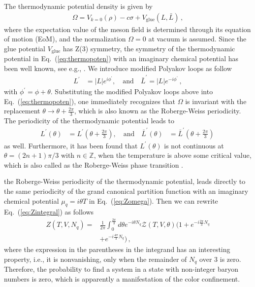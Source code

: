 \documentclass[%
reprint,
superscriptaddress,
showpacs,preprintnumbers,
 amsmath,amssymb,
 aps,
prd,
]{revtex4-1}
\def\Eq#1{Eq.~(\ref{#1})}
\begin{document}
The thermodynamic potential density is given by 
\begin{align}
  \Omega=V_{k=0}(\rho)-c\sigma+V_\text{glue}(L,\bar L)\,,\label{eq:thermopoten}
\end{align}
where the expectation value of the meson field is determined through its equation of motion (EoM), and the normalization $\Omega=0$ at vacuum is assumed. Since the glue potential $V_\text{glue}$ has Z(3) symmetry, the symmetry of the thermodynamic potential in \Eq{eq:thermopoten} with an imaginary chemical potential has been well known, see e.g., \cite{Roberge:1986mm,Sakai:2008py}. We introduce modified Polyakov loops as follow
\begin{align}
  L^{\prime}&=|L| e^{i\phi^{\prime}},\quad \text{and}\quad \bar L^{\prime}=|L| e^{-i\phi^{\prime}}\,,\label{eq:Ploopmodi}
\end{align}
with $\phi^{\prime}=\phi+\theta$. Substituting the modified Polyakov loops above into \Eq{eq:thermopoten}, one immediately recognizes that $ \Omega$ is invariant with the replacement $\theta \rightarrow \theta + \frac{2\pi}{3}$, which is also known as the Roberge-Weiss periodicity. The periodicity of the thermodynamic potential leads to
\begin{align}
  L^{\prime}(\theta)&=L^{\prime}(\theta+\frac{2\pi}{3}),\quad \text{and}\quad \bar L^{\prime}(\theta)&=\bar L^{\prime}(\theta+\frac{2\pi}{3})\,\label{}
\end{align}
as well. Furthermore, it has been found that $L^{\prime}(\theta)$ is not continuous at $\theta=(2n+1)\pi/3$ with $n\in\mathbb{Z}$, when the temperature is above some critical value, which is also called as the Roberge-Weiss phase transition \cite{Roberge:1986mm}.

the Roberge-Weiss periodicity of the thermodynamic potential, leads directly to the same periodicity of the grand canonical partition function with an imaginary chemical potential $\mu_q=i \theta T$ in \Eq{eq:Zomega}. Then we can rewrite \Eq{eq:Zintegral} as follows
\begin{align}
  Z(T,V,N_q)=&\frac{1}{2\pi } \int_{0}^{\frac{2\pi}{3}} d \theta e^{-i \theta N_q}\mathcal{Z}(T,V,\theta) \Big(1+e^{-i \frac{2\pi}{3} N_q}\nonumber\\[2ex]
   &+e^{-i \frac{4\pi}{3} N_q}\Big)\,,\label{}
\end{align}
where the expression in the parentheses in the integrand has an interesting property, i.e., it is nonvanishing, only when the remainder of $N_q$ over 3 is zero. Therefore, the probability to find a system in a state with non-integer baryon numbers is zero, which is apparently a  manifestation of the color confinement.
\end{document}
